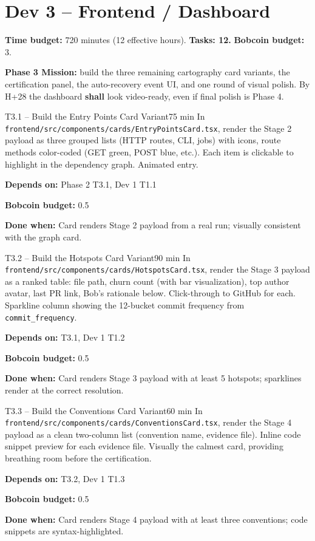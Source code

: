 \documentclass[11pt,letterpaper]{article}
\newcommand{\acceptance}[1]{\par\smallskip\textcolor{ibmgreen}{\textbf{Done when:}} #1}
\newcommand{\depends}[1]{\par\smallskip\textcolor{ibmorange}{\textbf{Depends on:}} #1}
\newcommand{\bobcost}[1]{\par\smallskip\textcolor{ibmaccent}{\textbf{Bobcoin budget:}} #1}
\newcommand{\shall}{\textbf{shall}}
\begin{document}
\section{Dev 3 -- Frontend / Dashboard}

\textbf{Time budget:} 720 minutes (12 effective hours). \textbf{Tasks: 12.} \textbf{Bobcoin budget:} 3.

\textbf{Phase 3 Mission:} build the three remaining cartography card variants, the certification panel, the auto-recovery event UI, and one round of visual polish. By H+28 the dashboard \shall{} look video-ready, even if final polish is Phase 4.

\begin{task}{T3.1 -- Build the Entry Points Card Variant}{75 min}
In \texttt{frontend/src/components/cards/EntryPointsCard.tsx}, render the Stage 2 payload as three grouped lists (HTTP routes, CLI, jobs) with icons, route methods color-coded (GET green, POST blue, etc.). Each item is clickable to highlight in the dependency graph. Animated entry.
\depends{Phase 2 T3.1, Dev 1 T1.1}
\bobcost{0.5}
\acceptance{Card renders Stage 2 payload from a real run; visually consistent with the graph card.}
\end{task}

\begin{task}{T3.2 -- Build the Hotspots Card Variant}{90 min}
In \texttt{frontend/src/components/cards/HotspotsCard.tsx}, render the Stage 3 payload as a ranked table: file path, churn count (with bar visualization), top author avatar, last PR link, Bob's rationale below. Click-through to GitHub for each. Sparkline column showing the 12-bucket commit frequency from \texttt{commit\_frequency}.
\depends{T3.1, Dev 1 T1.2}
\bobcost{0.5}
\acceptance{Card renders Stage 3 payload with at least 5 hotspots; sparklines render at the correct resolution.}
\end{task}

\begin{task}{T3.3 -- Build the Conventions Card Variant}{60 min}
In \texttt{frontend/src/components/cards/ConventionsCard.tsx}, render the Stage 4 payload as a clean two-column list (convention name, evidence file). Inline code snippet preview for each evidence file. Visually the calmest card, providing breathing room before the certification.
\depends{T3.2, Dev 1 T1.3}
\bobcost{0.5}
\acceptance{Card renders Stage 4 payload with at least three conventions; code snippets are syntax-highlighted.}
\end{task}
\end{document}
